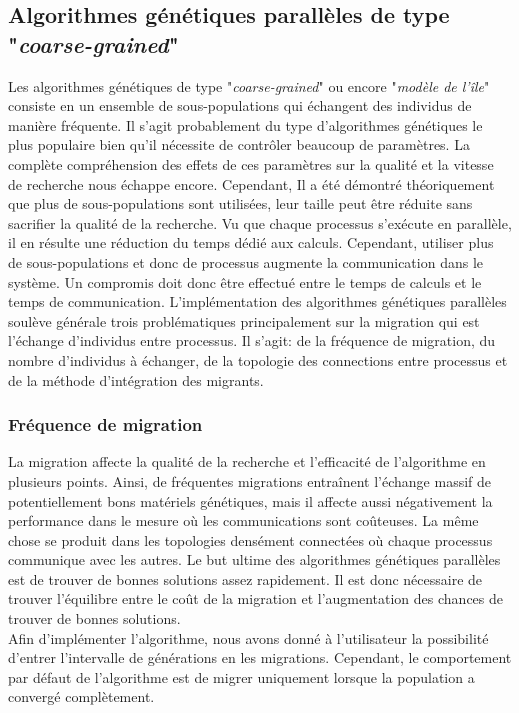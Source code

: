 \documentclass[12pt,a4paper]{article}
\begin{document}
	\subsection{Algorithmes génétiques parallèles de type "\emph{coarse-grained}"}
	Les algorithmes génétiques de type "\emph{coarse-grained}" ou encore "\emph{modèle de l'île}" consiste en un ensemble de sous-populations qui échangent des individus de manière fréquente. Il s'agit probablement du type d'algorithmes génétiques le plus populaire bien qu'il nécessite de contrôler beaucoup de paramètres. La complète compréhension des effets de ces paramètres sur la qualité et la vitesse de recherche nous échappe encore. Cependant, Il a été démontré théoriquement que plus de sous-populations sont utilisées, leur taille peut être réduite sans sacrifier la qualité de la recherche. Vu que chaque processus s'exécute en parallèle, il en résulte une réduction du temps dédié aux calculs. Cependant, utiliser plus de sous-populations et donc de processus augmente la communication dans le système. Un compromis doit donc être effectué entre le temps de calculs et le temps de communication. L'implémentation des algorithmes génétiques parallèles soulève générale trois problématiques principalement sur la migration qui est l'échange d'individus entre processus. Il s'agit: de la fréquence de migration, du nombre d'individus à échanger, de la topologie des connections entre processus et de la méthode d'intégration des migrants.
	\subsubsection{Fréquence de migration}
	La migration affecte la qualité de la recherche et l'efficacité de l'algorithme en plusieurs points. Ainsi, de fréquentes migrations entraînent l'échange massif de potentiellement bons matériels génétiques, mais il affecte aussi négativement la performance dans le mesure où les communications sont coûteuses. La même chose se produit dans les topologies densément connectées où chaque processus communique avec les autres. Le but ultime des algorithmes génétiques parallèles est de trouver de bonnes solutions assez rapidement. Il est donc nécessaire de trouver l'équilibre entre le coût de la migration et l'augmentation des chances de trouver de bonnes solutions. \\
	\hspace*{.5cm} Afin d'implémenter l'algorithme, nous avons donné à l'utilisateur la possibilité d'entrer l'intervalle de générations en les migrations. Cependant, le comportement par défaut de l'algorithme est de migrer uniquement lorsque la population a convergé complètement.  
\end{document}
